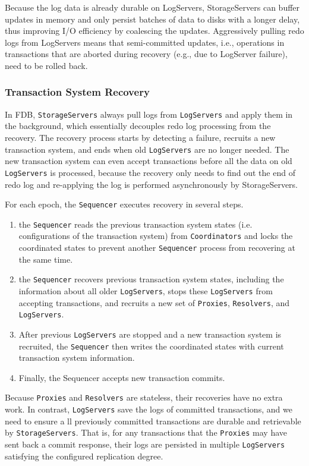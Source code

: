 \documentclass[11pt]{article}
\begin{document}
Because the log data is already durable on LogServers, StorageServers can buffer updates in memory and
only persist batches of data to disks with a longer delay, thus improving I/O efficiency by coalescing
the updates. Aggressively pulling redo logs from LogServers means that semi-committed updates, i.e.,
operations in transactions that are aborted during recovery (e.g., due to LogServer failure), need to
be rolled back.
\subsubsection{Transaction System Recovery}
\label{sec:org852a0b9}
In FDB, \texttt{StorageServers} always pull logs from \texttt{LogServers} and apply them in the background, which
essentially decouples redo log processing from the recovery. The recovery process starts by detecting
a failure, recruits a new transaction system, and ends when old \texttt{LogServers} are no longer needed. The
new transaction system can even accept transactions before all the data on old \texttt{LogServers} is
processed, because the recovery only needs to find out the end of redo log and re-applying the log is
performed asynchronously by StorageServers.

For each epoch, the \texttt{Sequencer} executes recovery in several steps.
\begin{enumerate}
\item the \texttt{Sequencer} reads the previous transaction system states (i.e. configurations of the transaction
system) from \texttt{Coordinators} and locks the coordinated states to prevent another \texttt{Sequencer} process
from recovering at the same time.
\item the \texttt{Sequencer} recovers previous transaction system states, including the information about all
older \texttt{LogServers}, stops these \texttt{LogServers} from accepting transactions, and recruits a new set of
\texttt{Proxies}, \texttt{Resolvers}, and \texttt{LogServers}.
\item After previous \texttt{LogServers} are stopped and a new transaction system is recruited, the \texttt{Sequencer} then
writes the coordinated states with current transaction system information.
\item Finally, the Sequencer accepts new transaction commits.
\end{enumerate}

Because \texttt{Proxies} and \texttt{Resolvers} are stateless, their recoveries have no extra work. In contrast,
\texttt{LogServers} save the logs of committed transactions, and we need to ensure a ll previously committed
transactions are durable and retrievable by \texttt{StorageServers}. That is, for any transactions that the
\texttt{Proxies} may have sent back a commit response, their logs are persisted in multiple \texttt{LogServers}
satisfying the configured replication degree.
\end{document}
